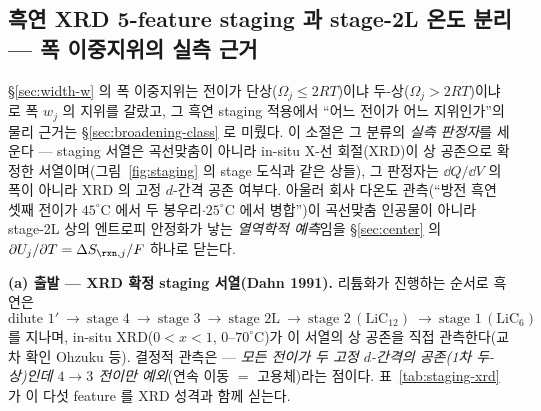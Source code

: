 \subsection{흑연 XRD 5-feature staging 과 stage-2L 온도 분리 --- 폭 이중지위의 실측 근거}\label{sec:staging-2L}
\S\ref{sec:width-w} 의 폭 이중지위는 전이가 단상($\Omega_j\!\le\!2RT$)이냐 두-상($\Omega_j\!>\!2RT$)이냐로 폭
$w_j$ 의 지위를 갈랐고, 그 흑연 staging 적용에서 ``어느 전이가 어느 지위인가''의 물리 근거는 \S\ref{sec:broadening-class}
로 미뤘다. 이 소절은 그 분류의 \emph{실측 판정자}를 세운다 --- staging 서열은 곡선맞춤이 아니라 in-situ X-선
회절(XRD)이 상 공존으로 확정한 서열이며(그림~\ref{fig:staging} 의 stage 도식과 같은 상들), 그 판정자는
$\dd Q/\dd V$ 의 폭이 아니라 XRD 의 고정 $d$-간격 공존 여부다. 아울러 회사 다온도 관측(``방전 흑연 셋째 전이가
$45^\circ$C 에서 두 봉우리$\cdot$$25^\circ$C 에서 병합'')이 곡선맞춤 인공물이 아니라 stage-2L 상의 엔트로피 안정화가
낳는 \emph{열역학적 예측}임을 \S\ref{sec:center} 의 $\partial U_j/\partial T=\Delta S_{\rxn,j}/F$ 하나로 닫는다.

\textbf{(a) 출발 --- XRD 확정 staging 서열(Dahn 1991).} 리튬화가 진행하는 순서로 흑연은
\[
\text{dilute }1'\ \to\ \text{stage }4\ \to\ \text{stage }3\ \to\ \text{stage }2\mathrm L\ \to\ \text{stage }2\,(\mathrm{LiC_{12}})\ \to\ \text{stage }1\,(\mathrm{LiC_6})
\]
를 지나며, in-situ XRD($0\!<\!x\!<\!1$, $0$--$70^\circ$C)가 이 서열의 상 공존을 직접 관측한다\cite{dahn1991}(교차
확인 Ohzuku 등\cite{ohzuku1993}). 결정적 관측은 --- \emph{모든 전이가 두 고정 $d$-간격의 공존(1차 두-상)인데
$4\!\to\!3$ 전이만 예외}(연속 이동 $=$ 고용체)라는 점이다. 표~\ref{tab:staging-xrd} 가 이 다섯 feature 를 XRD
성격과 함께 싣는다.

